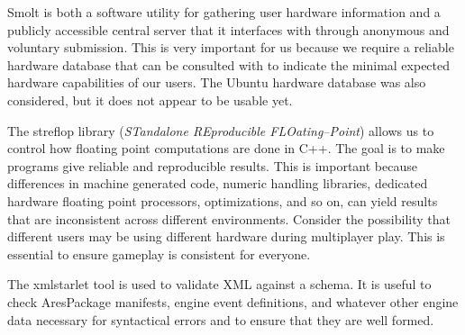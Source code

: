 
Smolt is both a software utility for gathering user hardware information and a publicly accessible central server that it interfaces with through anonymous and voluntary submission. This is very important for us because we require a reliable hardware database that can be consulted with to indicate the minimal expected hardware capabilities of our users. The Ubuntu hardware database was also considered, but it does not appear to be usable yet.


The streflop library ({\it STandalone REproducible FLOating--Point}) allows us to control how floating point computations are done in C++. The goal is to make programs give reliable and reproducible results. This is important because differences in machine generated code, numeric handling libraries, dedicated hardware floating point processors, optimizations, and so on, can yield results that are inconsistent across different environments. Consider the possibility that different users may be using different hardware during multiplayer play. This is essential to ensure gameplay is consistent for everyone.


The xmlstarlet tool is used to validate XML against a schema. It is useful to check AresPackage manifests, engine event definitions, and whatever other engine data necessary for syntactical errors and to ensure that they are well formed.
\stopitemize

